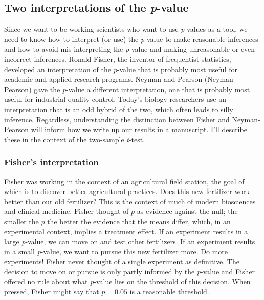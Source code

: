 \documentclass[]{book}
\begin{document}
\hypertarget{two-interpretations-of-the-p-value}{%
\subsection{\texorpdfstring{Two interpretations of the \emph{p}-value}{Two interpretations of the p-value}}\label{two-interpretations-of-the-p-value}}

Since we want to be working scientists who want to use \emph{p}-values as a tool, we need to know how to interpret (or use) the \emph{p}-value to make reasonable inferences and how to avoid mis-interpreting the \emph{p}-value and making unreasonable or even incorrect inferences. Ronald Fisher, the inventor of frequentist statistics, developed an interpretation of the \emph{p}-value that is probably most useful for academic and applied research programs. Neyman and Pearson (Neyman-Pearson) gave the \emph{p}-value a different interpretation, one that is probably most useful for industrial quality control. Today's biology researchers use an interpretation that is an odd hybrid of the two, which often leads to silly inference. Regardless, understanding the distinction between Fisher and Neyman-Pearson will inform how we write up our results in a manuscript. I'll describe these in the context of the two-sample \emph{t}-test.

\hypertarget{fishers-interpretation}{%
\subsubsection{Fisher's interpretation}\label{fishers-interpretation}}

Fisher was working in the context of an agricultural field station, the goal of which is to discover better agricultural practices. Does this new fertilizer work better than our old fertilizer? This is the context of much of modern biosciences and clinical medicine. Fisher thought of \(p\) as evidence against the null; the smaller the \(p\) the better the evidence that the means differ, which, in an experimental context, implies a treatment effect. If an experiment results in a large \emph{p}-value, we can move on and test other fertilizers. If an experiment results in a small \emph{p}-value, we want to pursue this new fertilizer more. Do more experiments! Fisher never thought of a single experiment as definitive. The decision to move on or pursue is only partly informed by the \emph{p}-value and Fisher offered no rule about what \emph{p}-value lies on the threshold of this decision. When pressed, Fisher might say that \(p=0.05\) is a reasonable threshold.
\end{document}
